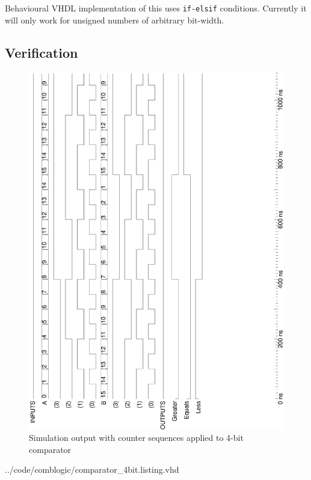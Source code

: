 \documentclass[10pt,a4paper]{report}
\begin{document}
 Behavioural VHDL implementation of this
 uses \texttt{if-elsif} conditions. Currently
 it will only work for unsigned numbers
 of arbitrary bit-width.

\subsection{Verification}


 \begin{figure}[h!]
 \center
 \includegraphics[scale=0.37,angle=-90]{graphs/COMP4_simulation.ps}
 \caption{\small{Simulation output with counter sequences applied
 to 4-bit comparator}} \label{wave:comp4}
 \end{figure}


{../code/comblogic/comparator_4bit.listing.vhd}
\end{document}
